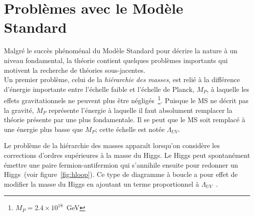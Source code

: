 



\section{Problèmes avec le Modèle Standard}
\label{sec:ms:problemes}

Malgré le succès phénoménal du Modèle Standard pour décrire la nature
à un niveau fondamental, la théorie contient quelques problèmes
importants qui motivent la recherche de théories sous-jacentes. \\

Un premier problème, celui de la \emph{hiérarchie des masses}, est
relié à la différence d'énergie importante entre l'échelle faible et
l'échelle de Planck, $M_P$, à laquelle les effets gravitationnels ne
peuvent plus être négligés~\footnote{$M_P = 2.4 \times 10^{18}$~GeV}. Puisque le MS ne décrit pas la gravité,
$M_P$ représente l'énergie à laquelle il faut absolument remplacer la
théorie présente par une plus fondamentale. Il se peut que le MS soit
remplacé à une énergie plus basse que $M_P$; cette échelle est notée $\Lambda_{UV}$.

Le problème de la hiérarchie des masses apparaît lorsqu'on considère
les corrections d'ordres supérieures à la masse du Higgs. Le Higgs peut
spontanément émettre une paire fermion-antifermion qui s'annihile
ensuite pour redonner un Higgs~(voir figure~\ref{fig:hloop}). Ce type de diagramme à boucle a pour
effet de modifier la masse du Higgs en ajoutant un terme proportionnel
à $\Lambda_{UV}$~\cite{martin_supersymmetry_1997}.

